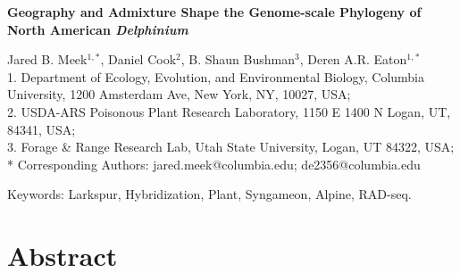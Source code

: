 \documentclass[11pt]{article}
\begin{document}
\begin{center}
	{\bf \Large
	Geography and Admixture Shape the Genome-scale Phylogeny of \\
	North American \emph{Delphinium}\\[0.5cm]
	}

Jared B. Meek$^{1,*}$, Daniel Cook$^2$, B. Shaun Bushman$^3$, Deren A.R. Eaton$^{1,*}$\\[0.5cm]

1. Department of Ecology, Evolution, and Environmental Biology, Columbia University, 1200 Amsterdam Ave, New York, NY, 10027, USA;\\
2. USDA-ARS Poisonous Plant Research Laboratory, 1150 E 1400 N Logan, UT, 84341, USA;\\ 3. Forage \& Range Research Lab, Utah State University, Logan, UT 84322, USA;\\ 
* Corresponding Authors: jared.meek@columbia.edu; de2356@columbia.edu

\end{center}

Keywords: Larkspur, Hybridization, Plant, Syngameon, Alpine, RAD-seq.

\RaggedRight

\section*{Abstract}
\end{document}
